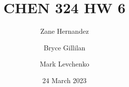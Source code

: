 \documentclass[12pt]{article}
\title{CHEN 324 HW 6}
\author[1]{Zane Hernandez}
\author[2]{Bryce Gillilan}
\author[3]{Mark Levchenko}
\affil[1,2,3]{Group 11}
\date{24 March 2023}
\begin{document}
\begin{enumerate}

    
    
    
    
    
    

\end{enumerate}
\end{document}
